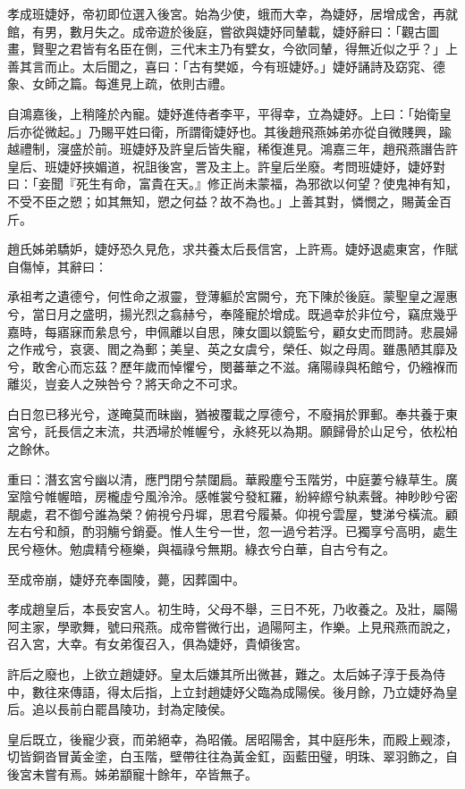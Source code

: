 \begin{pinyinscope}
孝成班婕妤，帝初即位選入後宮。始為少使，蛾而大幸，為婕妤，居增成舍，再就館，有男，數月失之。成帝遊於後庭，嘗欲與婕妤同輦載，婕妤辭曰：「觀古圖畫，賢聖之君皆有名臣在側，三代末主乃有嬖女，今欲同輦，得無近似之乎？」上善其言而止。太后聞之，喜曰：「古有樊姬，今有班婕妤。」婕妤誦詩及窈窕、德象、女師之篇。每進見上疏，依則古禮。

自鴻嘉後，上稍隆於內寵。婕妤進侍者李平，平得幸，立為婕妤。上曰：「始衛皇后亦從微起。」乃賜平姓曰衛，所謂衛婕妤也。其後趙飛燕姊弟亦從自微賤興，踰越禮制，寖盛於前。班婕妤及許皇后皆失寵，稀復進見。鴻嘉三年，趙飛燕譖告許皇后、班婕妤挾媚道，祝詛後宮，詈及主上。許皇后坐廢。考問班婕妤，婕妤對曰：「妾聞『死生有命，富貴在天。』修正尚未蒙福，為邪欲以何望？使鬼神有知，不受不臣之愬；如其無知，愬之何益？故不為也。」上善其對，憐憫之，賜黃金百斤。

趙氏姊弟驕妒，婕妤恐久見危，求共養太后長信宮，上許焉。婕妤退處東宮，作賦自傷悼，其辭曰：

承祖考之遺德兮，何性命之淑靈，登薄軀於宮闕兮，充下陳於後庭。蒙聖皇之渥惠兮，當日月之盛明，揚光烈之翕赫兮，奉隆寵於增成。既過幸於非位兮，竊庶幾乎嘉時，每寤寐而絫息兮，申佩離以自思，陳女圖以鏡監兮，顧女史而問詩。悲晨婦之作戒兮，哀褒、閻之為郵；美皇、英之女虞兮，榮任、姒之母周。雖愚陋其靡及兮，敢舍心而忘茲？歷年歲而悼懼兮，閔蕃華之不滋。痛陽祿與柘館兮，仍繈褓而離災，豈妾人之殃咎兮？將天命之不可求。

白日忽已移光兮，遂晻莫而昧幽，猶被覆載之厚德兮，不廢捐於罪郵。奉共養于東宮兮，託長信之末流，共洒埽於帷幄兮，永終死以為期。願歸骨於山足兮，依松柏之餘休。

重曰：潛玄宮兮幽以清，應門閉兮禁闥扃。華殿塵兮玉階労，中庭萋兮綠草生。廣室陰兮帷幄暗，房櫳虛兮風泠泠。感帷裳兮發紅羅，紛綷縩兮紈素聲。神眇眇兮密靚處，君不御兮誰為榮？俯視兮丹墀，思君兮履綦。仰視兮雲屋，雙涕兮橫流。顧左右兮和顏，酌羽觴兮銷憂。惟人生兮一世，忽一過兮若浮。已獨享兮高明，處生民兮極休。勉虞精兮極樂，與福祿兮無期。綠衣兮白華，自古兮有之。

至成帝崩，婕妤充奉園陵，薨，因葬園中。

孝成趙皇后，本長安宮人。初生時，父母不舉，三日不死，乃收養之。及壯，屬陽阿主家，學歌舞，號曰飛燕。成帝嘗微行出，過陽阿主，作樂。上見飛燕而說之，召入宮，大幸。有女弟復召入，俱為婕妤，貴傾後宮。

許后之廢也，上欲立趙婕妤。皇太后嫌其所出微甚，難之。太后姊子淳于長為侍中，數往來傳語，得太后指，上立封趙婕妤父臨為成陽侯。後月餘，乃立婕妤為皇后。追以長前白罷昌陵功，封為定陵侯。

皇后既立，後寵少衰，而弟絕幸，為昭儀。居昭陽舍，其中庭彤朱，而殿上觋漆，切皆銅沓冒黃金塗，白玉階，壁帶往往為黃金釭，函藍田璧，明珠、翠羽飾之，自後宮未嘗有焉。姊弟顓寵十餘年，卒皆無子。


\end{pinyinscope}
